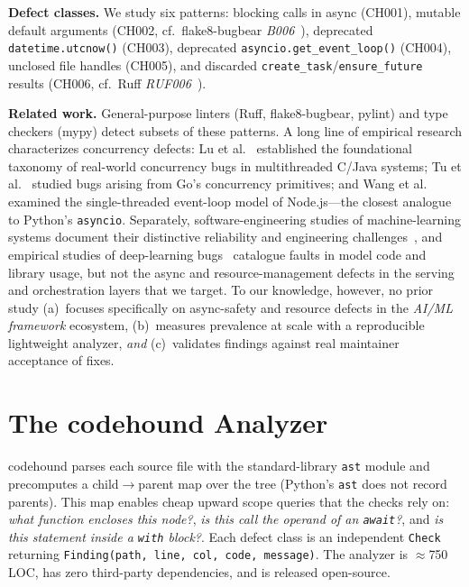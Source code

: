 \documentclass[conference]{IEEEtran}
\begin{document}
\textbf{Defect classes.} We study six patterns: blocking calls in async (CH001), mutable default arguments (CH002, cf.\ flake8-bugbear \emph{B006}~\cite{bugbear}), deprecated \texttt{datetime.utcnow()} (CH003), deprecated \texttt{asyncio.get\_event\_loop()} (CH004), unclosed file handles (CH005), and discarded \texttt{create\_task}/\texttt{ensure\_future} results (CH006, cf.\ Ruff \emph{RUF006}~\cite{ruff}).

\textbf{Related work.} General-purpose linters (Ruff, flake8-bugbear, pylint) and type checkers (mypy) detect subsets of these patterns. A long line of empirical research characterizes concurrency defects: Lu et al.~\cite{lu2008} established the foundational taxonomy of real-world concurrency bugs in multithreaded C/Java systems; Tu et al.~\cite{tu2019} studied bugs arising from Go's concurrency primitives; and Wang et al.~\cite{wang2017} examined the single-threaded event-loop model of Node.js---the closest analogue to Python's \texttt{asyncio}. Separately, software-engineering studies of machine-learning systems document their distinctive reliability and engineering challenges~\cite{amershi2019,sculley2015}, and empirical studies of deep-learning bugs~\cite{islam2019,humbatova2020} catalogue faults in model code and library usage, but not the async and resource-management defects in the serving and orchestration layers that we target. To our knowledge, however, no prior study (a)~focuses specifically on async-safety and resource defects in the \emph{AI/ML framework} ecosystem, (b)~measures prevalence at scale with a reproducible lightweight analyzer, \emph{and} (c)~validates findings against real maintainer acceptance of fixes.

\section{The codehound Analyzer}
codehound parses each source file with the standard-library \texttt{ast} module and precomputes a child$\rightarrow$parent map over the tree (Python's \texttt{ast} does not record parents). This map enables cheap upward scope queries that the checks rely on: \emph{what function encloses this node?}, \emph{is this call the operand of an \texttt{await}?}, and \emph{is this statement inside a \texttt{with} block?}. Each defect class is an independent \texttt{Check} returning \texttt{Finding(path, line, col, code, message)}. The analyzer is $\approx$750 LOC, has zero third-party dependencies, and is released open-source.
\end{document}
